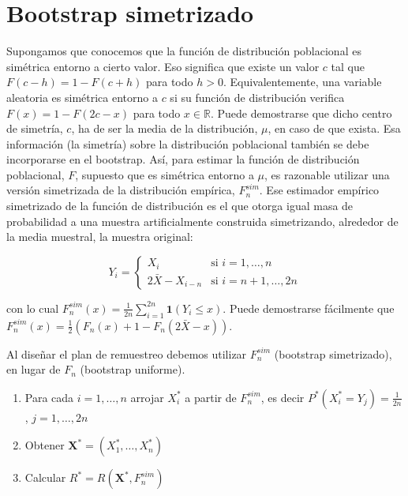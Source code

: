 \documentclass[]{book}
\theoremstyle{definition}
\theoremstyle{definition}
\theoremstyle{definition}
\theoremstyle{remark}
\begin{document}
\section{Bootstrap simetrizado}\label{bootstrap-simetrizado}

Supongamos que conocemos que la función de distribución poblacional es
simétrica entorno a cierto valor. Eso significa que existe un valor
\(c\) tal que \(F\left( c-h \right) =1-F\left( c+h \right)\) para todo
\(h>0\). Equivalentemente, una variable aleatoria es simétrica entorno a
\(c\) si su función de distribución verifica
\(F\left( x \right) =1-F\left( 2c-x \right)\) para todo
\(x\in \mathbb{R}\). Puede demostrarse que dicho centro de simetría,
\(c\), ha de ser la media de la distribución, \(\mu\), en caso de que
exista. Esa información (la simetría) sobre la distribución poblacional
también se debe incorporarse en el bootstrap. Así, para estimar la
función de distribución poblacional, \(F\), supuesto que es simétrica
entorno a \(\mu\), es razonable utilizar una versión simetrizada de la
distribución empírica, \(F_n^{sim}\). Ese estimador empírico simetrizado
de la función de distribución es el que otorga igual masa de
probabilidad a una muestra artificialmente construida simetrizando,
alrededor de la media muestral, la muestra original:

\[Y_i=\left\{ 
\begin{array}{ll}
X_i & \text{si } i=1,\ldots ,n \\ 
2\bar{X}-X_{i-n} &\text{si } i=n+1,\ldots ,2n
\end{array}
\right.\]

con lo cual
\(F_n^{sim}\left( x \right) =\frac{1}{2n}\sum_{i=1}^{2n}\mathbf{1}\left( Y_i\leq x \right)\).
Puede demostrarse fácilmente que
\(F_n^{sim}\left( x \right) =\frac{1}{2}\left( F_n\left( x \right) +1-F_n\left( 2\bar{X}-x \right) \right)\).

Al diseñar el plan de remuestreo debemos utilizar \(F_n^{sim}\)
(bootstrap simetrizado), en lugar de \(F_n\) (bootstrap uniforme).

\begin{enumerate}
\def\labelenumi{\arabic{enumi}.}
\item
  Para cada \(i=1,\ldots ,n\) arrojar \(X_i^{\ast}\) a partir de
  \(F_n^{sim}\), es decir
  \(P^{\ast}\left( X_i^{\ast}=Y_j \right) =\frac{1 }{2n}\),
  \(j=1,\ldots ,2n\)
\item
  Obtener
  \(\mathbf{X}^{\ast}=\left( X_1^{\ast},\ldots ,X_n^{\ast} \right)\)
\item
  Calcular \(R^{\ast}=R\left( \mathbf{X}^{\ast},F_n^{sim} \right)\)
\end{enumerate}
\end{document}
